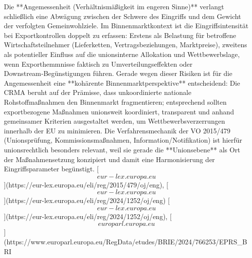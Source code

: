 \documentclass[12pt,a4paper,oneside]{book} %
\begin{document}
Die **Angemessenheit (Verhältnismäßigkeit im engeren Sinne)** verlangt schließlich eine Abwägung zwischen der Schwere des Eingriffs und dem Gewicht der verfolgten Gemeinwohlziele. Im Binnenmarktkontext ist die Eingriffsintensität bei Exportkontrollen doppelt zu erfassen: Erstens als Belastung für betroffene Wirtschaftsteilnehmer (Lieferketten, Vertragsbeziehungen, Marktpreise), zweitens als potentieller Einfluss auf die unionsinterne Allokation und Wettbewerbslage, wenn Exporthemmnisse faktisch zu Umverteilungseffekten oder Downstream‑Begünstigungen führen.  Gerade wegen dieser Risiken ist für die Angemessenheit eine **kohärente Binnenmarktperspektive** entscheidend: Die CRMA beruht auf der Prämisse, dass unkoordinierte nationale Rohstoffmaßnahmen den Binnenmarkt fragmentieren; entsprechend sollten exportbezogene Maßnahmen unionsweit koordiniert, transparent und anhand gemeinsamer Kriterien ausgestaltet werden, um Wettbewerbsverzerrungen innerhalb der EU zu minimieren.  Die Verfahrensmechanik der VO 2015/479 (Unionsprüfung, Kommissionsmaßnahmen, Information/Notifikation) ist hierfür unionsrechtlich besonders relevant, weil sie gerade die **Unionsebene** als Ort der Maßnahmensetzung konzipiert und damit eine Harmonisierung der Eingriffsparameter begünstigt. [\[eur-lex.europa.eu\]](https://eur-lex.europa.eu/eli/reg/2015/479/oj/eng), [\[eur-lex.europa.eu\]](https://eur-lex.europa.eu/eli/reg/2024/1252/oj/eng) [\[eur-lex.europa.eu\]](https://eur-lex.europa.eu/eli/reg/2024/1252/oj/eng), [\[europarl.europa.eu\]](https://www.europarl.europa.eu/RegData/etudes/BRIE/2024/766253/EPRS_BRI%
\end{document}
